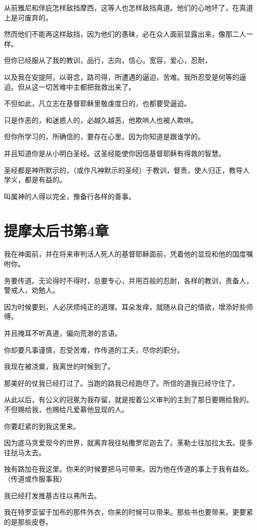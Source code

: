 \documentclass[12pt,oneside]{book}
\begin{document}
从前雅尼和佯庇怎样敌挡摩西，这等人也怎样敌挡真道。他们的心地坏了，在真道上是可废弃的。

然而他们不能再这样敌挡，因为他们的愚昧，必在众人面前显露出来，像那二人一样。

但你已经服从了我的教训，品行，志向，信心，宽容，爱心，忍耐，

以及我在安提阿，以哥念，路司得，所遭遇的逼迫，苦难。我所忍受是何等的逼迫。但从这一切苦难中主都把我救出来了。

不但如此，凡立志在基督耶稣里敬虔度日的，也都要受逼迫。

只是作恶的，和迷惑人的，必越久越恶，他欺哄人也被人欺哄。

但你所学习的，所确信的，要存在心里。因为你知道是跟谁学的。

并且知道你是从小明白圣经。这圣经能使你因信基督耶稣有得救的智慧。

圣经都是神所默示的，（或作凡神默示的圣经）于教训，督责，使人归正，教导人学义，都是有益的。

叫属神的人得以完全，豫备行各样的善事。

\chapter{提摩太后书第4章}
我在神面前，并在将来审判活人死人的基督耶稣面前，凭着他的显现和他的国度嘱咐你。

务要传道。无论得时不得时，总要专心，并用百般的忍耐，各样的教训，责备人，警戒人，劝勉人。

因为时候要到，人必厌烦纯正的道理。耳朵发痒，就随从自己的情欲，增添好些师傅。

并且掩耳不听真道，偏向荒渺的言语。

你却要凡事谨慎，忍受苦难，作传道的工夫，尽你的职分。

我现在被浇奠，我离世的时候到了。

那美好的仗我已经打过了。当跑的路我已经跑尽了。所信的道我已经守住了。

从此以后，有公义的冠冕为我存留，就是按着公义审判的主到了那日要赐给我的。不但赐给我，也赐给凡爱慕他显现的人。

你要赶紧的到我这里来。

因为底马贪爱现今的世界，就离弃我往帖撒罗尼迦去了。革勒士往加拉太去。提多往挞马太去。

独有路加在我这里。你来的时候要把马可带来。因为他在传道的事上于我有益处。（传道或作服事我）

我已经打发推基古往以弗所去。

我在特罗亚留于加布的那件外衣，你来的时候可以带来。那些书也要带来。更要紧的是那些皮卷。
\end{document}
